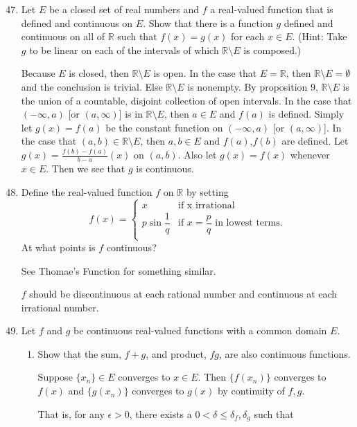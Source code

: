 \begin{enumerate}
	\setcounter{enumi}{46}
	\item Let $E$ be a closed set of real numbers and $f$ a real-valued function that is defined and continuous on $E$. Show that there is a function $g$ defined and continuous on all of $\mathbb{R}$ such that $f(x) = g(x)$ for each $x \in E$. (Hint: Take $g$ to be linear on each of the intervals of which $\mathbb{R} \setminus E$ is composed.)\par
	Because $E$ is closed, then $\mathbb{R} \setminus E$ is open. 
	In the case that $E = \mathbb{R}$, then  $\mathbb{R} \setminus E = \emptyset$ and the conclusion is trivial. 
	Else $\mathbb{R} \setminus E$ is nonempty. By proposition 9, $\mathbb{R} \setminus E$ is the union of a countable, disjoint collection of open intervals.	
	In the case that $(-\infty,a)$ [or $(a,\infty)$] is in $\mathbb{R} \setminus E$, then $a \in E$ and $f(a)$ is defined.
	Simply let $g(x)=f(a)$ be the constant function on $(-\infty,a)$ [or $(a,\infty)$].
	In the case that $(a,b) \in \mathbb{R} \setminus E$, then $a,b\in E$ and $f(a)$,$f(b)$ are defined.
	Let $g(x)=\frac{f(b)-f(a)}{b-a}(x)$ on $(a,b)$.
	Also let $g(x)=f(x)$ whenever $x\in E$. Then we see that $g$ is continuous.
	\item Define the real-valued function $f$ on $\mathbb{R}$ by setting 
	\[ 
	f(x) =
	\begin{cases} 
		x & \text{if x irrational}\\
		p \sin \dfrac{1}{q} & \text{if } x = \dfrac{p}{q} \text{ in lowest terms.} \\
	\end{cases}
	\]
	At what points is $f$ continuous?\par
	See Thomae's Function for something similar.\par
	$f$ should be discontinuous at each rational number and continuous at each irrational number.
	\item Let $f$ and $g$ be continuous real-valued functions with a common domain $E$.
	\begin{enumerate}[label=(\roman*),align=left]
        \item Show that the sum, $f+g$, and product, $fg$, are also continuous functions.\par
        Suppose $\{x_n\}\in E$ converges to $x\in E$.
        Then $\{f(x_n)\}$ converges to $f(x)$ and $\{g(x_n)\}$ converges to $g(x)$ by continuity of $f,g$.
		\par
		That is, for any $\epsilon>0$, there exists a $0<\delta\le \delta_f,\delta_g$ such that

\end{enumerate}
\end{enumerate}
